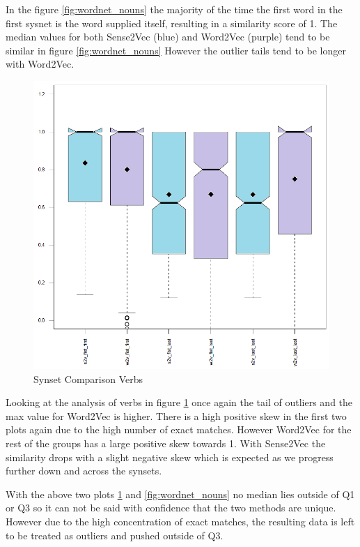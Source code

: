 \noindent
In the figure \ref{fig:wordnet_nouns} the majority of the time the first word in the first sysnet is the word supplied itself, resulting in a similarity score of 1. The median values for both Sense2Vec (blue) and Word2Vec (purple) tend to be similar in figure \ref{fig:wordnet_nouns} However the outlier tails tend to be longer with Word2Vec.

\begin{figure}[H]
\centering
  \includegraphics[width=\textwidth]{images/wordnet_verbs.PNG}
  \caption{Synset Comparison Verbs}
  \label{fig:wordnet_verbs}
\end{figure}

\noindent
Looking at the analysis of verbs in figure \ref{fig:wordnet_verbs} once again the tail of outliers and the max value for Word2Vec is higher. There is a high positive skew in the first two plots again due to the high number of exact matches. However Word2Vec for the rest of the groups has a large positive skew towards 1. With Sense2Vec the similarity drops with a slight negative skew which is expected as we progress further down and across the synsets.

With the above two plots \ref{fig:wordnet_verbs} and \ref{fig:wordnet_nouns} no median lies outside of Q1 or Q3 so it can not be said with confidence that the two methods are unique. However due to the high concentration of exact matches, the resulting data is left to be treated as outliers and pushed outside of Q3.

